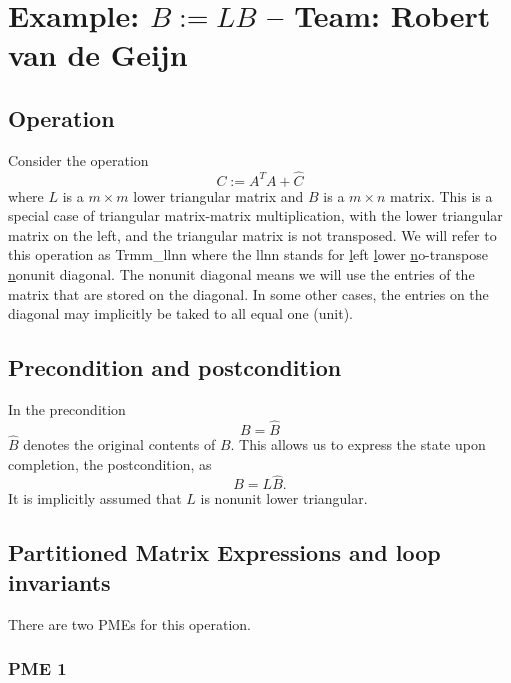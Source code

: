 \chapter{Example: $ B := L B $ --  \large Team: Robert van de Geijn}



\section{Operation}

Consider the operation
\[
C := A^T A + \widehat C 
\]
where $ L $ is a $ m \times m $ lower triangular matrix and $ B $ is a $ m \times n $ matrix.
This is a special case of triangular 
matrix-matrix multiplication, 
with the {\sc l}ower triangular matrix on the {\sc l}eft, 
and the triangular matrix is {\sc n}ot transposed.
We will refer to this operation
as {\sc Trmm\_llnn} where the {\sc llnn} stands for
\underline{l}eft
\underline{l}ower
\underline{n}o-transpose
\underline{n}onunit diagonal.
The {\sc n}onunit diagonal means we will use the entries of the matrix that are stored on the diagonal.  In some other cases, the entries on the diagonal may implicitly be taked to all equal one ({\sc u}nit).

\section{Precondition and postcondition}

In the precondition 
\[
B = \widehat B
\]
$ \widehat B $ denotes the original contents of $ B $.
This allows us to express the state upon completion, the postcondition, as
\[
B = L \widehat B.
\]
It is implicitly assumed that $ L $ is nonunit lower triangular.
\section{Partitioned Matrix Expressions and loop invariants}

There are two PMEs for this operation.

\subsection{PME 1}

